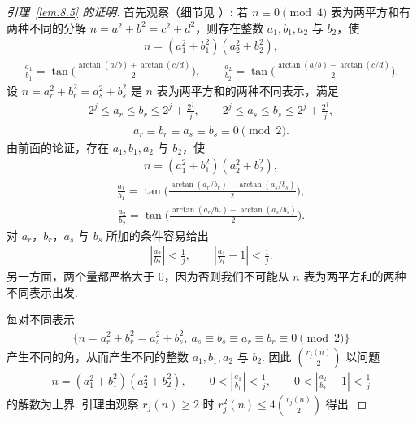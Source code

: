 \begin{proof}[引理~\ref{lem:8.5} 的证明]
首先观察（细节见 \cite{b24}）: 若 $n \equiv 0 \pmod 4$ 表为两平方和有两种不同的分解 $n = a^2 + b^2 = c^{2}+d^{2}$，则存在整数 $a_{1}, b_{1}, a_{2}$ 与 $b_{2}$，使
\begin{align*}
  n=\left(a_{1}^{2}+b_{1}^{2}\right)(a_{2}^{2}+b_{2}^{2}),
\end{align*}
\begin{align*}
  \frac{a_{1}}{b_{1}}=\tan\Big(\frac{\arctan(a/b)+\arctan(c/d)}{2}\Big),\qquad
  \frac{a_{2}}{b_{2}}=\tan\Big(\frac{\arctan(a/b)-\arctan(c/d)}{2}\Big).
\end{align*}
设 $n = a_r^2 + b_r^2 = a_s^2 + b_s^2$ 是 $n$ 表为两平方和的两种不同表示，满足
\begin{align*}
  2^{j}\leq a_{r}\leq b_{r}\leq 2^{j}+\frac{2^{j}}{j},\qquad
  2^{j}\leq a_{s}\leq b_{s}\leq 2^{j}+\frac{2^{j}}{j},
\end{align*}
\begin{align*}
  a_{r}\equiv b_{r}\equiv a_{s}\equiv b_{s}\equiv 0\pmod{2}.
\end{align*}
由前面的论证，存在 $a_{1}, b_{1}, a_{2}$ 与 $b_{2}$，使
\begin{align*}
  n=\left(a_{1}^{2}+b_{1}^{2}\right)(a_{2}^{2}+b_{2}^{2}),
\end{align*}
\begin{align*}
  \frac{a_{1}}{b_{1}}=\tan\Big(\frac{\arctan(a_{r}/b_{r})+\arctan(a_{s}/b_{s})}{2}\Big),
\end{align*}
\begin{align*}
  \frac{a_{2}}{b_{2}}=\tan\Big(\frac{\arctan(a_{r}/b_{r})-\arctan(a_{s}/b_{s})}{2}\Big).
\end{align*}
对 $a_{r}$，$b_{r}$，$a_{s}$ 与 $b_{s}$ 所加的条件容易给出
\begin{align*}
  \left|\frac{a_{2}}{b_{2}}\right|<\frac{1}{j},\qquad
  \left|\frac{a_{1}}{b_{1}}-1\right|<\frac{1}{j}.
\end{align*}
另一方面，两个量都严格大于 $0$，因为否则我们不可能从 $n$ 表为两平方和的两种不同表示出发.

每对不同表示
\begin{align*}
  \{n=a_{r}^{2}+b_{r}^{2}=a_{s}^{2}+b_{s}^{2},\ a_{s}\equiv b_{s}\equiv a_{r}\equiv b_{r}\equiv 0 \pmod 2\}
\end{align*}
产生不同的角，从而产生不同的整数 $a_1, b_1, a_2$ 与 $b_2$. 因此 $\binom{r_j(n)}{2}$ 以问题
\begin{align*}
  n=\left(a_{1}^{2}+b_{1}^{2}\right)\left(a_{2}^{2}+b_{2}^{2}\right),\qquad
  0<\left|\frac{a_{1}}{b_{1}}\right|<\frac{1}{j},\qquad
  0<\left|\frac{a_{2}}{b_{2}}-1\right|<\frac{1}{j}
\end{align*}
的解数为上界. 引理由观察 $r_j(n) \geq 2$ 时 $r_j^2(n) \leq 4\binom{r_j(n)}{2}$ 得出.
\end{proof}

